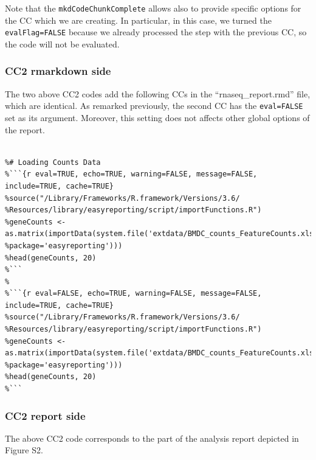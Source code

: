 \documentclass[]{article}
\begin{document}
Note that the \texttt{mkdCodeChunkComplete} allows also to provide
specific options for the CC which we are creating. In particular, in
this case, we turned the \texttt{evalFlag=FALSE} because we already
processed the step with the previous CC, so the code will not be
evaluated.

\hypertarget{cc2-rmarkdown-side}{%
\subsubsection{CC2 rmarkdown side}\label{cc2-rmarkdown-side}}

The two above CC2 codes add the following CCs in the
``rnaseq\_report.rmd'' file, which are identical. As remarked
previously, the second CC has the \texttt{eval=FALSE} set as its
argument. Moreover, this setting does not affects other global options
of the report.

\begin{verbatim}
 
%# Loading Counts Data
%```{r eval=TRUE, echo=TRUE, warning=FALSE, message=FALSE, include=TRUE, cache=TRUE}
%source("/Library/Frameworks/R.framework/Versions/3.6/
%Resources/library/easyreporting/script/importFunctions.R")
%geneCounts <- as.matrix(importData(system.file('extdata/BMDC_counts_FeatureCounts.xlsx', 
%package='easyreporting')))
%head(geneCounts, 20)
%```
%
%```{r eval=FALSE, echo=TRUE, warning=FALSE, message=FALSE, include=TRUE, cache=TRUE}
%source("/Library/Frameworks/R.framework/Versions/3.6/
%Resources/library/easyreporting/script/importFunctions.R")
%geneCounts <- as.matrix(importData(system.file('extdata/BMDC_counts_FeatureCounts.xlsx', 
%package='easyreporting')))
%head(geneCounts, 20)
%```
\end{verbatim}

\hypertarget{cc2-report-side}{%
\subsubsection{CC2 report side}\label{cc2-report-side}}

The above CC2 code corresponds to the part of the analysis report
depicted in Figure S2.
\end{document}
